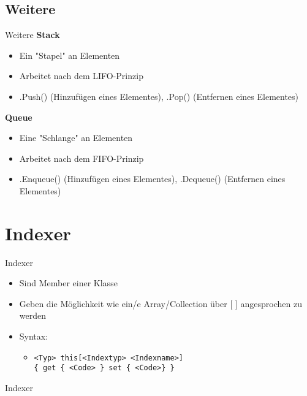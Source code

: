 \subsection{Weitere}
\begin{frame}{Weitere}
	\textbf{Stack}\\
	\begin{itemize}
		\item Ein "Stapel" an Elementen
		\item Arbeitet nach dem LIFO-Prinzip
		\item \alert{.Push()} (Hinzufügen eines Elementes), \alert{.Pop()} (Entfernen eines Elementes)
	\end{itemize}
	
	\textbf{Queue}\\
	\begin{itemize}
		\item Eine "Schlange" an Elementen
		\item Arbeitet nach dem FIFO-Prinzip
		\item \alert{.Enqueue()} (Hinzufügen eines Elementes), \alert{.Dequeue()} (Entfernen eines Elementes)
	\end{itemize}
	
\end{frame}

\section{Indexer}
\begin{frame}{Indexer}
	\begin{itemize}
		\item Sind Member einer Klasse
		\item Geben die Möglichkeit wie ein/e Array/Collection über \alert{[ ]} angesprochen zu werden
		\item Syntax:
		\begin{itemize}
			\item \texttt{\alert{<Typ>} this[\alert{<Indextyp> <Indexname>}]\\ \{ get \{ \alert{<Code>} \} set \{ \alert{<Code>}\} \}}
		\end{itemize}
	\end{itemize}
\end{frame}

\begin{frame}{Indexer}
	
\end{frame}


